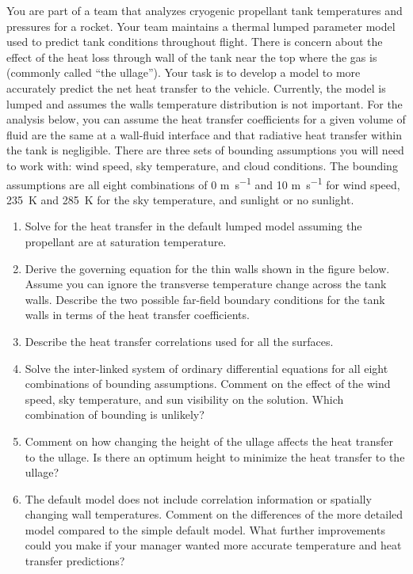 \documentclass[12pt,letterpaper]{article}
\begin{document}
You are part of a team that analyzes cryogenic propellant tank temperatures and pressures for a rocket.
Your team maintains a thermal lumped parameter model used to predict tank conditions throughout flight.
There is concern about the effect of the heat loss through wall of the tank near the top where the gas is (commonly called ``the ullage'').
Your task is to develop a model to more accurately predict the net heat transfer to the vehicle.
Currently, the model is lumped and assumes the walls temperature distribution is not important.
For the analysis below, you can assume the heat transfer coefficients for a given volume of fluid are the same at a wall-fluid interface and that radiative heat transfer within the tank is negligible.
There are three sets of bounding assumptions you will need to work with: wind speed, sky temperature, and cloud conditions.
The bounding assumptions are all eight combinations of 0 \si{\meter\per\second} and 10 \si{\meter\per\second} for wind speed, \SI{235}{\kelvin} and \SI{285}{\kelvin} for the sky temperature, and sunlight or no sunlight.

\begin{enumerate}
    \item Solve for the heat transfer in the default lumped model assuming the propellant are at saturation temperature.
    
    \item Derive the governing equation for the thin walls shown in the figure below.
        Assume you can ignore the transverse temperature change across the tank walls.
        Describe the two possible far-field boundary conditions for the tank walls in terms of the heat transfer coefficients.

    \item Describe the heat transfer correlations used for all the surfaces.

    \item Solve the inter-linked system of ordinary differential equations for all eight combinations of bounding assumptions.
        Comment on the effect of the wind speed, sky temperature, and sun visibility on the solution.
        Which combination of bounding is unlikely?

    \item Comment on how changing the height of the ullage affects the heat transfer to the ullage.
        Is there an optimum height to minimize the heat transfer to the ullage?

    \item The default model does not include correlation information or spatially changing wall temperatures.
        Comment on the differences of the more detailed model compared to the simple default model.
        What further improvements could you make if your manager wanted more accurate temperature and heat transfer predictions?
\end{enumerate}
\end{document}
